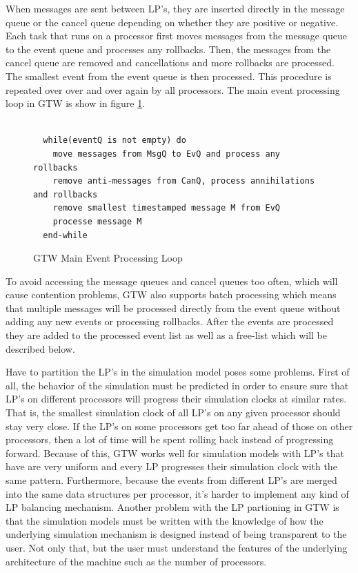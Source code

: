 \documentclass[11pt]{book}
\begin{document}
\noindent
When messages are sent between LP's, they are inserted directly in the message queue or the cancel queue
depending on whether they are positive or negative. Each task that runs on a processor first
moves messages from the message queue to the event queue and processes any rollbacks. Then,
the messages from the cancel queue are removed and cancellations and more rollbacks are processed. The
smallest event from the event queue is then processed. This procedure is repeated over over and over
again by all processors. The main event processing loop in GTW is show in figure \ref{gtw_processing}.

\begin{figure}
\centering
\begin{verbatim}

  while(eventQ is not empty) do
    move messages from MsgQ to EvQ and process any rollbacks
    remove anti-messages from CanQ, process annihilations and rollbacks
    remove smallest timestamped message M from EvQ
    processe message M
  end-while

\end{verbatim}
\caption{GTW Main Event Processing Loop\cite{das-94}\cite{fujimoto-94}\label{gtw_processing}}
\end{figure}

\noindent
To avoid accessing the message queues and cancel queues too often, which will cause contention
problems, GTW also supports batch processing which means that multiple messages will be processed
directly from the event queue without adding any new events or processing rollbacks. After the events
are processed they are added to the processed event list as well as a free-list which will be
described below.

Have to partition the LP's in the simulation model poses some problems. First of all, the behavior
of the simulation must be predicted in order to ensure sure that LP's on different processors will
progress their simulation clocks at similar rates. That is, the smallest simulation clock of all LP's
on any given processor should stay very close. If the LP's on some processors get too far ahead of
those on other processors, then a lot of time will be spent rolling back instead of progressing forward.
Because of this, GTW works well for simulation models with LP's that have are very uniform and every
LP progresses their simulation clock with the same pattern. Furthermore, because the events from
different LP's are merged into the same data structures per processor, it's harder to implement
any kind of LP balancing mechanism. Another problem with the LP partioning in GTW is that the simulation
models must be written with the knowledge of how the underlying simulation mechanism is designed
instead of being transparent to the user. Not only that, but the user must understand the features
of the underlying architecture of the machine such as the number of processors.
\end{document}
